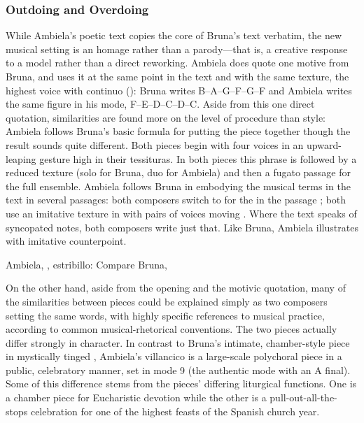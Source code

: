 \subsubsection{Outdoing and Overdoing}

While Ambiela's poetic text copies the core of Bruna's text verbatim, the new
musical setting is an homage rather than a parody---that is, a creative
response to a model rather than a direct reworking.
Ambiela does quote one motive from Bruna, and uses it at the same point in the
text and with the same texture, the highest voice with continuo
(): Bruna writes
B\fl--A--G--F\sh--G--F\sh{} and Ambiela writes the same figure in his mode,
F--E--D--C\sh--D--C\sh.
Aside from this one direct quotation, similarities are found more on the level
of procedure than style: Ambiela follows Bruna's basic formula for putting the
piece together though the result sounds quite different.
Both pieces begin with four voices in an upward-leaping gesture high in their
tessituras.  
In both pieces this phrase is followed by a reduced texture (solo for Bruna,
duo for Ambiela) and then a fugato passage for the full ensemble.
Ambiela follows Bruna in embodying the musical terms in the text in several
passages: both composers switch to \meterC{} for the  in the
passage ; both use an imitative texture in
 with pairs of voices moving .
Where the text speaks of syncopated notes, both composers write just that.
Like Bruna, Ambiela illustrates  with imitative counterpoint.


\begin{musicexample}
    \caption{Ambiela, , estribillo: Compare Bruna,
    }
    \label{mus:Ambiela-Suban_las_voces-mudando}
\end{musicexample}

On the other hand, aside from the opening and the motivic quotation, many of
the similarities between pieces could be explained simply as two composers
setting the same words, with highly specific references to musical practice,
according to common musical-rhetorical conventions.
The two pieces actually differ strongly in character.
In contrast to Bruna's intimate, chamber-style piece in mystically tinged
, Ambiela's villancico is a large-scale polychoral piece in
a public, celebratory manner, set in mode 9 (the authentic mode with an A
final).
Some of this difference stems from the pieces' differing liturgical functions. 
One is a chamber piece for Eucharistic devotion while the other is a
pull-out-all-the-stops celebration for one of the highest feasts of the Spanish
church year.

